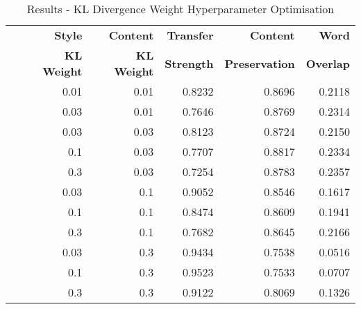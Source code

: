\begin{table}[ht]
	\centering
	\begin{tabular}{| c | r | r | r | r | r |}
		\hline
		\multirow{2}{*}{
		} & \textbf{Style}     & \textbf{Content}   & \textbf{Transfer} & \textbf{Content}      & \textbf{Word}    \\
		  & \textbf{KL Weight} & \textbf{KL Weight} & \textbf{Strength} & \textbf{Preservation} & \textbf{Overlap} \\
		\hline
		\hline
		  & 0.01               & 0.01               & 0.8232            & 0.8696                & 0.2118           \\
		\hline
		  & 0.03               & 0.01               & 0.7646            & 0.8769                & 0.2314           \\
		\hline
		  & 0.03               & 0.03               & 0.8123            & 0.8724                & 0.2150           \\
		\hline
		  & 0.1                & 0.03               & 0.7707            & 0.8817                & 0.2334           \\
		\hline
		  & 0.3                & 0.03               & 0.7254            & 0.8783                & 0.2357           \\
		\hline
		  & 0.03               & 0.1                & 0.9052            & 0.8546                & 0.1617           \\
		\hline
		  & 0.1                & 0.1                & 0.8474            & 0.8609                & 0.1941           \\
		\hline
		  & 0.3                & 0.1                & 0.7682            & 0.8645                & 0.2166           \\
		\hline
		  & 0.03               & 0.3                & 0.9434            & 0.7538                & 0.0516           \\
		\hline
		  & 0.1                & 0.3                & 0.9523            & 0.7533                & 0.0707           \\
		\hline
		  & 0.3                & 0.3                & 0.9122            & 0.8069                & 0.1326           \\
		\hline
	\end{tabular}
	\caption{Results - KL Divergence Weight Hyperparameter Optimisation}
	\label{tab:kl-hyperparam-opt}
\end{table}

